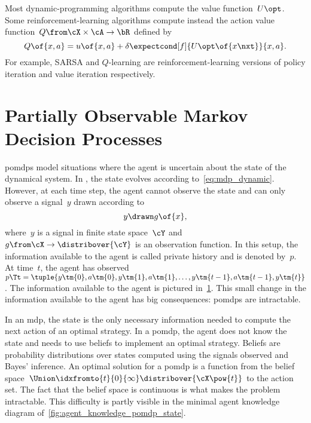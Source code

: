 Most dynamic-programming algorithms compute the value function~\(U\opt\).
Some reinforcement-learning algorithms compute instead the action value function~\(Q \from \cX \times \cA \to \bR\) defined by
\begin{equation*}
Q \of {x, a} = u \of {x, a} + \delta \expectcond[f]{U\opt \of{x\nxt}} {x, a}.
\end{equation*}
For example, SARSA and \(Q\)-learning are reinforcement-learning versions of policy iteration and value iteration respectively.


\section{Partially Observable Markov Decision Processes}
\label{sec:pomdps}

\Acp{pomdp} model situations where the agent is uncertain about the state of the dynamical system.
In , the state evolves according to~\cref{eq:mdp_dynamic}.
However, at each time step, the agent cannot observe the state and can only observe a signal~\(y\) drawn according to
\begin{equation*}
y \drawn g \of {x},
\end{equation*}
where~\(y\) is a signal in finite state space~\(\cY\) and~\(g \from \cX \to \distribover{\cY}\) is an observation function.
In this setup, the information available to the agent is called private history and is denoted by~\(p\).
At time~\(t\), the agent has observed~\(p\Tt = \tuple{y\tm{0}, a\tm{0}, y\tm{1}, a\tm{1}, \dots,  y\tm{t-1}, a\tm{t-1}, y\tm{t}}\).
The information available to the agent is pictured in~\cref{fig:agent_knowledge_pomdp}.
This small change in the information available to the agent has big consequences: \acp{pomdp} are intractable.

\begin{figure}[htp]
\centering
{}
\label{fig:agent_knowledge_pomdp}
\end{figure}

In an \ac{mdp}, the state is the only necessary information needed to compute the next action of an optimal strategy.
In a \ac{pomdp}, the agent does not know the state and needs to use beliefs to implement an optimal strategy.
Beliefs are probability distributions over states computed using the signals observed and Bayes' inference.
An optimal solution for a \ac{pomdp} is a function from the belief space~\(\Union\idxfromto{t}{0}{\infty}\distribover{\cX\pow{t}}\) to the action set.
The fact that the belief space is continuous is what makes the problem intractable.
This difficulty is partly visible in the minimal agent knowledge diagram of~\cref{fig:agent_knowledge_pomdp_state}.

